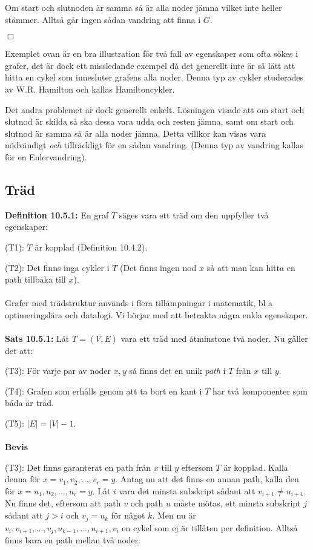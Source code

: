 \documentclass{article}
\begin{document}
Om start och slutnoden är samma så är alla noder jämna vilket inte heller stämmer. Alltså går ingen sådan vandring att finna i $G$.
\begin{flushright}
$\Box$
\end{flushright}
Exemplet ovan är en bra illustration för två fall av egenskaper som ofta sökes i grafer, det är dock ett missledande exempel då det generellt inte är så lätt att hitta en cykel som innesluter grafens alla noder. Denna typ av cykler studerades av W.R. Hamilton och kallas Hamiltoncykler.

Det andra problemet är dock generellt enkelt. Lösningen visade att om start och slutnod är skilda så ska dessa vara udda och resten jämna, samt om start och slutnod är samma så är alla noder jämna. Detta villkor kan visas vara nödvändigt \textit{och} tillräckligt för en sådan vandring. (Denna typ av vandring kallas för en Eulervandring).

\subsection{Träd}
\textbf{Definition 10.5.1:} En graf $T$ säges vara ett träd om den uppfyller två egenskaper:

(T1): $T$ är kopplad (Definition 10.4.2).

(T2): Det finns inga cykler i $T$ (Det finns ingen nod $x$ så att man kan hitta en path tillbaka till $x$).\\ \\
Grafer med trädstruktur används i flera tillämpningar i matematik, bl a optimeringslära och datalogi. Vi börjar med att betrakta några enkla egenskaper.\\ \\
\textbf{Sats 10.5.1:} Låt $T=(V,E)$ vara ett träd med åtminstone två noder. Nu gäller det att:

(T3): För varje par av noder $x,y$ så finns det en unik \textit{path} i $T$ från $x$ till $y$.

(T4): Grafen som erhålls genom att ta bort en kant i $T$ har två komponenter som båda är träd.

(T5): $|E|=|V|-1$.\\ \\
\textbf{Bevis}

(T3): Det finns garanterat en path från $x$ till $y$ eftersom $T$ är kopplad. Kalla denna för $x=v_1,v_2,...,v_r=y$. Antag nu att det finns en annan path, kalla den för $x=u_1,u_2,...,u_r=y$. Låt $i$ vara det minsta subskript sådant att $v_{i+1}\neq u_{i+1}$. Nu finns det, eftersom att path $v$ och path $u$ måste mötas, ett minsta subskript $j$ sådant att $j>i$ och $v_j=u_k$ för något $k$. Men nu är $v_i,v_{i+1},...,v_j,u_{k-1},...,u_{i+1},v_i$ en cykel som ej är tillåten per definition. Alltså finns bara en path mellan två noder.
\end{document}
